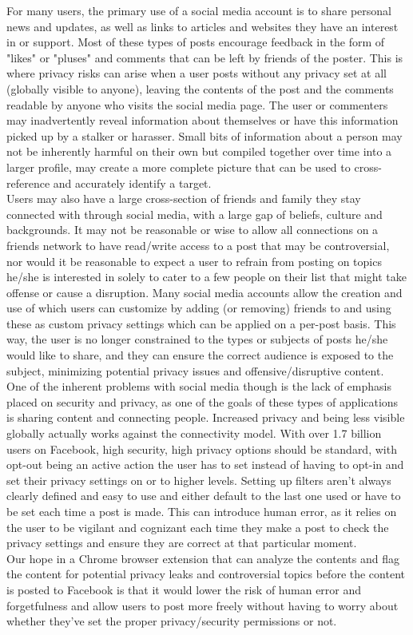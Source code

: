 \tab For many users, the primary use of a social media account is to share personal news and updates, as well as links to articles and websites they have an interest in or support. Most of these types of posts encourage feedback in the form of "likes" or "pluses" and comments that can be left by friends of the poster. This is where privacy risks can arise when a user posts without any privacy set at all (globally visible to anyone), leaving the contents of the post and the comments readable by anyone who visits the social media page. The user or commenters may inadvertently reveal information about themselves or have this information picked up by a stalker or harasser. Small bits of information about a person may not be inherently harmful on their own but compiled together over time into a larger profile, may create a more complete picture that can be used to cross-reference and accurately identify a target.\cite{ghazinour2016yourprivacyprotector} 
\\
\tab Users may also have a large cross-section of friends and family they stay connected with through social media, with a large gap of beliefs, culture and backgrounds. It may not be reasonable or wise to allow all connections on a friends network to have read/write access to a post that may be controversial, nor would it be reasonable to expect a user to refrain from posting on topics he/she is interested in solely to cater to a few people on their list that might take offense or cause a disruption. Many social media accounts allow the creation and use of  which users can customize by adding (or removing) friends to and using these as custom privacy settings which can be applied on a per-post basis. This way, the user is no longer constrained to the types or subjects of posts he/she would like to share, and they can ensure the correct audience is exposed to the subject, minimizing potential privacy issues and offensive/disruptive content.
\\
\tab One of the inherent problems with social media though is the lack of emphasis placed on security and privacy, as one of the goals of these types of applications is sharing content and connecting people. Increased privacy and being less visible globally actually works against the connectivity model. With over 1.7 billion users on Facebook\cite{statista}, high security, high privacy options should be standard, with opt-out being an active action the user has to set instead of having to opt-in and set their privacy settings on or to higher levels. Setting up filters aren't always clearly defined and easy to use and either default to the last one used or have to be set each time a post is made. This can introduce human error, as it relies on the user to be vigilant and cognizant each time they make a post to check the privacy settings and ensure they are correct at that particular moment. 
\\
\tab Our hope in a Chrome browser extension that can analyze the contents and flag the content for potential privacy leaks and controversial topics before the content is posted to Facebook is that it would lower the risk of human error and forgetfulness and allow users to post more freely without having to worry about whether they've set the proper privacy/security permissions or not. 
